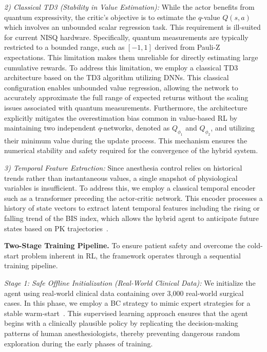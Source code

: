 \documentclass[pdflatex,sn-mathphys-num]{sn-jnl}%
\newcommand{\BfPara}[1]{{\noindent\bf#1.}\xspace}
\theoremstyle{thmstyleone}%
\theoremstyle{thmstyletwo}%
\theoremstyle{thmstylethree}%
\begin{document}
\noindent\textit{2) Classical TD3 (Stability in Value Estimation):}
While the actor benefits from quantum expressivity, the critic's objective is to estimate the $q$-value $Q(s,a)$ which involves an unbounded scalar regression task. This requirement is ill-suited for current NISQ hardware. Specifically, quantum measurements are typically restricted to a bounded range, such as $[-1, 1]$ derived from Pauli-Z expectations. This limitation makes them unreliable for directly estimating large cumulative rewards. To address this limitation, we employ a classical TD3 architecture based on the TD3 algorithm utilizing DNNs. This classical configuration enables unbounded value regression, allowing the network to accurately approximate the full range of expected returns without the scaling issues associated with quantum measurements. Furthermore, the architecture explicitly mitigates the overestimation bias common in value-based RL by maintaining two independent $q$-networks, denoted as $Q_{\phi_1}$ and $Q_{\phi_2}$, and utilizing their minimum value during the update process. This mechanism ensures the numerical stability and safety required for the convergence of the hybrid system.

\noindent\textit{3) Temporal Feature Extraction:}
Since anesthesia control relies on historical trends rather than instantaneous values, a single snapshot of physiological variables is insufficient. To address this, we employ a classical temporal encoder such as a transformer preceding the actor-critic network. This encoder processes a history of state vectors to extract latent temporal features including the rising or falling trend of the BIS index, which allows the hybrid agent to anticipate future states based on PK trajectories~\citep{lin_19_med}.

\BfPara{Two-Stage Training Pipeline}
To ensure patient safety and overcome the cold-start problem inherent in RL, the framework operates through a sequential training pipeline.

\noindent\textit{Stage 1: Safe Offline Initialization (Real-World Clinical Data):}
We initialize the agent using real-world clinical data containing over 3,000 real-world surgical cases. In this phase, we employ a BC strategy to mimic expert strategies for a stable warm-start~\citep{hes_18_dee}. This supervised learning approach ensures that the agent begins with a clinically plausible policy by replicating the decision-making patterns of human anesthesiologists, thereby preventing dangerous random exploration during the early phases of training.
\end{document}

